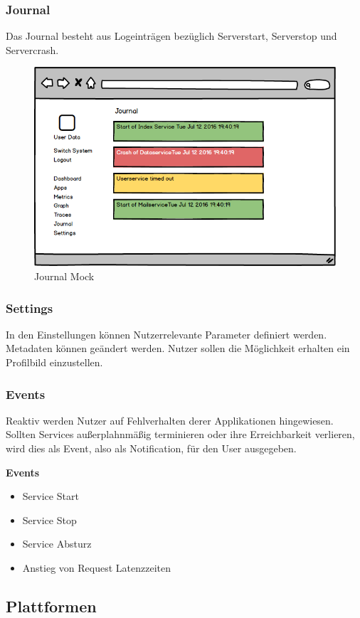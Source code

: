 \subsubsection{Journal}

Das Journal besteht aus Logeinträgen bezüglich Serverstart, Serverstop und Servercrash.

\begin{figure}[h]
 \centering
 \includegraphics[width=0.6\linewidth]{kapitel1/mocks/journal.png}
 \caption{Journal Mock}
\end{figure}

\subsubsection{Settings}

In den Einstellungen können Nutzerrelevante Parameter definiert werden. Metadaten können geändert werden.
Nutzer sollen die Möglichkeit erhalten ein Profilbild einzustellen.

\subsubsection{Events}

Reaktiv werden Nutzer auf Fehlverhalten derer Applikationen hingewiesen. Sollten Services außerplahnmäßig terminieren oder ihre Erreichbarkeit verlieren,
wird dies als Event, also als Notification, für den User ausgegeben.

\textbf{Events}
\begin{itemize}
\item Service Start
\item Service Stop
\item Service Absturz
\item Anstieg von Request Latenzzeiten
\end{itemize}


\subsection{Plattformen}

